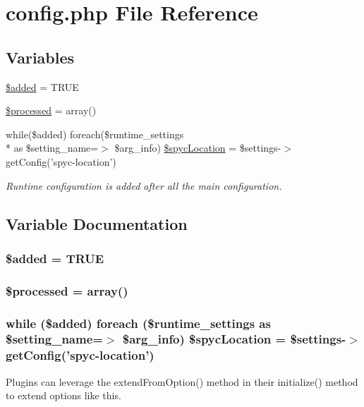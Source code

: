 \hypertarget{config_8php}{\section{config.\-php File Reference}
\label{config_8php}
}
\subsection*{Variables}
\begin{DoxyCompactItemize}
\item 
\hyperlink{config_8php_a9767ffa03df0cf18fa0ec9b89164433c}{\$added} = T\-R\-U\-E
\item 
\hyperlink{config_8php_aac44a4d5065e07e9a7a51ce8ef4a5c71}{\$processed} = array()
\item 
while(\$added) foreach(\$runtime\-\_\-settings \\*
as \$setting\-\_\-name=$>$ \$arg\-\_\-info) \hyperlink{config_8php_a27d26b2ea949372ad38e351488f93e76}{\$spyc\-Location} = \$settings-\/$>$get\-Config('spyc-\/location')
\begin{DoxyCompactList}\small\item\em Runtime configuration is added after all the main configuration. \end{DoxyCompactList}\end{DoxyCompactItemize}


\subsection{Variable Documentation}
\hypertarget{config_8php_a9767ffa03df0cf18fa0ec9b89164433c}{
\subsubsection[{\$added}]{\setlength{\rightskip}{0pt plus 5cm}\$added = T\-R\-U\-E}}\label{config_8php_a9767ffa03df0cf18fa0ec9b89164433c}
\hypertarget{config_8php_aac44a4d5065e07e9a7a51ce8ef4a5c71}{
\subsubsection[{\$processed}]{\setlength{\rightskip}{0pt plus 5cm}\$processed = array()}}\label{config_8php_aac44a4d5065e07e9a7a51ce8ef4a5c71}
\hypertarget{config_8php_a27d26b2ea949372ad38e351488f93e76}{
\subsubsection[{\$spyc\-Location}]{\setlength{\rightskip}{0pt plus 5cm}while (\$added) foreach (\$runtime\-\_\-settings as \$setting\-\_\-name=$>$ \$arg\-\_\-info) \$spyc\-Location = \$settings-\/$>$get\-Config('spyc-\/location')}}\label{config_8php_a27d26b2ea949372ad38e351488f93e76}
Plugins can leverage the extend\-From\-Option() method in their initialize() method to extend options like this. 